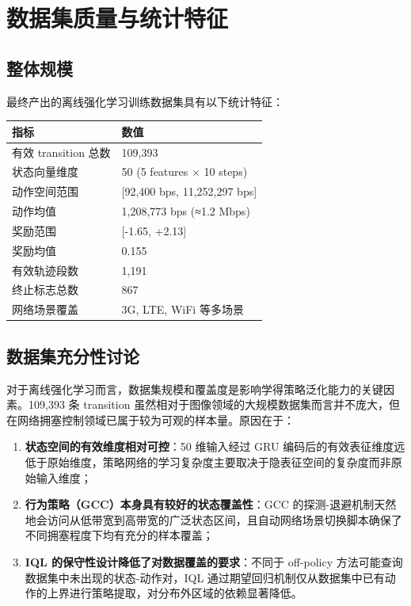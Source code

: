 \section{数据集质量与统计特征}

\subsection{整体规模}

最终产出的离线强化学习训练数据集具有以下统计特征：

\begin{table}[htbp]
    \centering
    \begin{tabular}{|l|l|}
        \hline
        指标 & 数值 \\
        \hline
        有效 transition 总数 & 109,393 \\
        \hline
        状态向量维度 & 50 (5 features × 10 steps) \\
        \hline
        动作空间范围 & [92,400 bps, 11,252,297 bps] \\
        \hline
        动作均值 & 1,208,773 bps (≈1.2 Mbps) \\
        \hline
        奖励范围 & [-1.65, +2.13] \\
        \hline
        奖励均值 & 0.155 \\
        \hline
        有效轨迹段数 & 1,191 \\
        \hline
        终止标志总数 & 867 \\
        \hline
        网络场景覆盖 & 3G, LTE, WiFi 等多场景 \\
        \hline
    \end{tabular}
\end{table}

\subsection{数据集充分性讨论}

对于离线强化学习而言，数据集规模和覆盖度是影响学得策略泛化能力的关键因素。109,393 条 transition 虽然相对于图像领域的大规模数据集而言并不庞大，但在网络拥塞控制领域已属于较为可观的样本量。原因在于：

\begin{enumerate}
    \item \textbf{状态空间的有效维度相对可控}：50 维输入经过 GRU 编码后的有效表征维度远低于原始维度，策略网络的学习复杂度主要取决于隐表征空间的复杂度而非原始输入维度；
    \item \textbf{行为策略（GCC）本身具有较好的状态覆盖性}：GCC 的探测-退避机制天然地会访问从低带宽到高带宽的广泛状态区间，且自动网络场景切换脚本确保了不同拥塞程度下均有充分的样本覆盖；
    \item \textbf{IQL 的保守性设计降低了对数据覆盖的要求}：不同于 off-policy 方法可能查询数据集中未出现的状态-动作对，IQL 通过期望回归机制仅从数据集中已有动作的上界进行策略提取，对分布外区域的依赖显著降低。
\end{enumerate}

